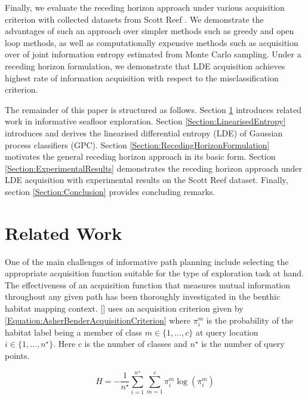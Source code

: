 \documentclass{article}
\newcommand{\incite}[1]{\citeauthor{#1} [\citeyear{#1}]}
\begin{document}
	Finally, we evaluate the receding horizon approach under various acquisition criterion with collected datasets from Scott Reef \cite{IMOS}. We demonstrate the advantages of such an approach over simpler methods such as greedy and open loop methods, as well as computationally expensive methods such as acquisition over of joint information entropy estimated from Monte Carlo sampling.  Under a receding horizon formulation, we demonstrate that LDE acquisition achieves highest rate of information acquisition with respect to the misclassification criterion.
	
	The remainder of this paper is structured as follows. Section \ref{Section:RelatedWork} introduces related work in informative seafloor exploration. Section \ref{Section:LinearisedEntropy} introduces and derives the linearised differential entropy (LDE) of Gaussian process classifiers (GPC). Section \ref{Section:RecedingHorizonFormulation} motivates the general receding horizon approach in its basic form. Section \ref{Section:ExperimentalResults} demonstrates the receding horizon approach under LDE acquisition with experimental results on the Scott Reef dataset. Finally, section \ref{Section:Conclusion} provides concluding remarks.
	
\section{Related Work}
\label{Section:RelatedWork}

	One of the main challenges of informative path planning include selecting the appropriate acquisition function suitable for the type of exploration task at hand. The effectiveness of an acquisition function that measures mutual information throughout any given path has been thoroughly investigated in the benthic habitat mapping context. \incite{AsherBender} uses an acquisition criterion given by \eqref{Equation:AsherBenderAcquisitionCriterion} where $\pi^{m}_{i}$ is the probability of the habitat label being a member of class $m \in \{1, \dots, c\}$ at query location $i \in \{1, \dots, n^{\star}\}$. Here $c$ is the number of classes and $n^{\star}$ is the number of query points.
	
	\begin{equation}
		H = - \frac{1}{n^{\star}} \sum_{i = 1}^{n^{\star}} \sum_{m = 1}^{c} \pi^{m}_{i} \log(\pi^{m}_{i})
	\label{Equation:AsherBenderAcquisitionCriterion}
	\end{equation}
	
\end{document}
